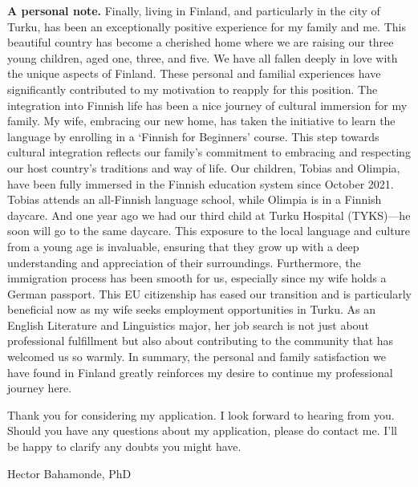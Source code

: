 \documentclass[10pt,stdletter,dateno,sigleft]{newlfm} %
\begin{document}
\begin{newlfm}
{\bf A personal note.} Finally, living in Finland, and particularly in the city of Turku, has been an exceptionally positive experience for my family and me. This beautiful country has become a cherished home where we are raising our three young children, aged one, three, and five. We have all fallen deeply in love with the unique aspects of Finland. These personal and familial experiences have significantly contributed to my motivation to reapply for this position. The integration into Finnish life has been a nice journey of cultural immersion for my family. My wife, embracing our new home, has taken the initiative to learn the language by enrolling in a `Finnish for Beginners' course. This step towards cultural integration reflects our family's commitment to embracing and respecting our host country's traditions and way of life. Our children, Tobias and Olimpia, have been fully immersed in the Finnish education system since October 2021. Tobias attends an all-Finnish language school, while Olimpia is in a Finnish daycare. And one year ago we had our third child at Turku Hospital (TYKS)---he soon will go to the same daycare. This exposure to the local language and culture from a young age is invaluable, ensuring that they grow up with a deep understanding and appreciation of their surroundings. Furthermore, the immigration process has been smooth for us, especially since my wife holds a German passport. This EU citizenship has eased our transition and is particularly beneficial now as my wife seeks employment opportunities in Turku. As an English Literature and Linguistics major, her job search is not just about professional fulfillment but also about contributing to the community that has welcomed us so warmly. In summary, the personal and family satisfaction we have found in Finland greatly reinforces my desire to continue my professional journey here.

Thank you for considering my application. I look forward to hearing from you. Should you have any questions about my application, please do contact me. I'll be happy to clarify any doubts you might have.




\vspace{3cm}

{\hspace{12cm}Hector Bahamonde, PhD}


\newpage

\printbibliography




\end{newlfm}
\end{document}
